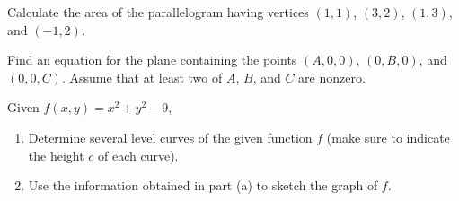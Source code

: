 \documentclass[12pt,letterpaper]{hmcpset}
\begin{document}

\begin{problem}[Colley 1.4.10]
  Calculate the area of the parallelogram having vertices $(1, 1)$, $(3, 2)$, $(1, 3)$, and $(-1, 2)$.
\end{problem}
\begin{solution}
\end{solution}
\pagebreak

\begin{problem}[Colley 1.5.4]
  Find an equation for the plane containing the points $(A, 0, 0)$, $(0, B, 0)$, and $(0, 0,C)$. Assume that at least two of $A$, $B$, and $C$ are nonzero.
\end{problem}
\begin{solution}
\end{solution}
\pagebreak

\begin{problem}[Colley 2.1.16]
  Given $f(x, y)=x^2+y^2 - 9$,
 \begin{enumerate}[label=(\alph*)]
  \item Determine several level curves of the given function $f$ (make sure to indicate the height $c$ of each curve).
  \item Use the information obtained in part (a) to sketch the graph of $f$.
  \end{enumerate}
\end{problem}
\begin{solution}
\end{solution}
\end{document}
